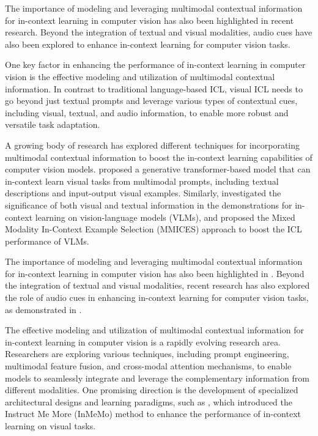 \documentclass[11pt]{article}
\begin{document}
The importance of modeling and leveraging multimodal contextual information for in-context learning in computer vision has also been highlighted in recent research. Beyond the integration of textual and visual modalities, audio cues have also been explored to enhance in-context learning for computer vision tasks.

One key factor in enhancing the performance of in-context learning in computer vision is the effective modeling and utilization of multimodal contextual information. In contrast to traditional language-based ICL, visual ICL needs to go beyond just textual prompts and leverage various types of contextual cues, including visual, textual, and audio information, to enable more robust and versatile task adaptation.

A growing body of research has explored different techniques for incorporating multimodal contextual information to boost the in-context learning capabilities of computer vision models. \cite{ref148} proposed a generative transformer-based model that can in-context learn visual tasks from multimodal prompts, including textual descriptions and input-output visual examples. Similarly, \cite{ref132} investigated the significance of both visual and textual information in the demonstrations for in-context learning on vision-language models (VLMs), and proposed the Mixed Modality In-Context Example Selection (MMICES) approach to boost the ICL performance of VLMs.

The importance of modeling and leveraging multimodal contextual information for in-context learning in computer vision has also been highlighted in \cite{ref184}. Beyond the integration of textual and visual modalities, recent research has also explored the role of audio cues in enhancing in-context learning for computer vision tasks, as demonstrated in \cite{ref231}.

The effective modeling and utilization of multimodal contextual information for in-context learning in computer vision is a rapidly evolving research area. Researchers are exploring various techniques, including prompt engineering, multimodal feature fusion, and cross-modal attention mechanisms, to enable models to seamlessly integrate and leverage the complementary information from different modalities. One promising direction is the development of specialized architectural designs and learning paradigms, such as \cite{ref9}, which introduced the Instruct Me More (InMeMo) method to enhance the performance of in-context learning on visual tasks.
\end{document}
